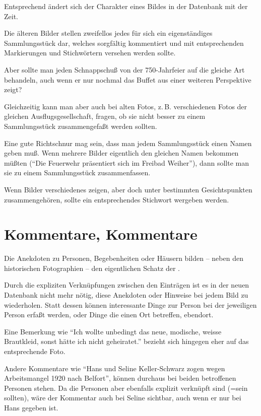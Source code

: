\documentclass[12pt]{scrreprt}
\begin{document}
Entsprechend ändert sich der Charakter eines Bildes in der Datenbank
mit der Zeit.

Die älteren Bilder stellen zweifellos jedes für sich ein
eigenständiges Sammlungsstück dar, welches sorgfältig kommentiert und
mit entsprechenden Markierungen und Stichwörtern versehen werden
sollte.

Aber sollte man jeden Schnappschuß von der 750-Jahrfeier auf die
gleiche Art behandeln, auch wenn er nur nochmal das Buffet aus einer
weiteren Perspektive zeigt?

Gleichzeitig kann man aber auch bei alten Fotos, z.\,B. verschiedenen
Fotos der gleichen Ausflugsgesellschaft, fragen, ob sie nicht besser
zu einem Sammlungsstück zusammengefaßt werden sollten.

Eine gute Richtschnur mag sein, dass man jedem Sammlungsstück einen
Namen geben muß. Wenn mehrere Bilder eigentlich den gleichen Namen
bekommen müßten (``Die Feuerwehr präsentiert sich im Freibad Weiher''),
dann sollte man sie zu einem Sammlungsstück zusammenfassen.

Wenn Bilder verschiedenes zeigen, aber doch unter bestimmten
Gesichtspunkten zusammengehören, sollte ein entsprechendes Stichwort
wergeben werden.

\section{Kommentare, Kommentare}

Die Anekdoten zu Personen, Begebenheiten oder Häusern bilden -- neben
den historischen Fotographien -- den eigentlichen Schatz der \DB{}.

Durch die expliziten Verknüpfungen zwischen den Einträgen ist es
in der neuen Datenbank nicht mehr nötig, diese Anekdoten oder Hinweise
bei jedem Bild zu wiederholen. Statt dessen können interessante
Dinge zur Person bei der jeweiligen Person erfaßt werden, oder
Dinge die einen Ort betreffen, ebendort.

Eine Bemerkung wie ``Ich wollte unbedingt das neue, modische, weisse
Brautkleid, sonst hätte ich nicht geheiratet.'' bezieht sich hingegen
eher auf das entsprechende Foto.

Andere Kommentare wie ``Hans und Seline Keller-Schwarz zogen wegen
Arbeitsmangel 1920 nach Belfort'', können durchaus bei beiden
betroffenen Personen stehen. Da die Personen aber ebenfalls explizit
verknüpft sind (=sein sollten), wäre der Kommentar auch bei Seline
sichtbar, auch wenn er nur bei Hans gegeben ist.
\end{document}
